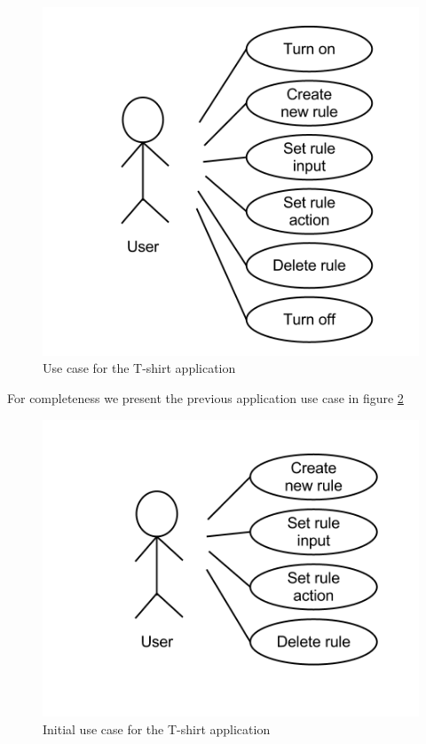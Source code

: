 \begin{figure}[H]
	\centering \includegraphics[scale=0.35]{img/design-tshirtappusecase2}
	\caption{Use case for the T-shirt application}
	\label{fig:design-tshirtappusecase2}
\end{figure}

For completeness we present the previous application use case in figure \ref{fig:design-tshirtappusecase1}

\begin{figure}[H]
	\centering \includegraphics[scale=0.35]{img/design-tshirtappusecase1}
	\caption{Initial use case for the T-shirt application}
	\label{fig:design-tshirtappusecase1}
\end{figure}


